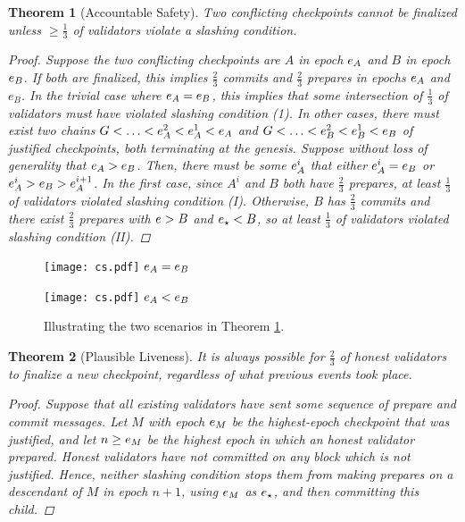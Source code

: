\documentclass[12pt, final]{article}
\newtheorem{theorem}{Theorem}
\newcommand{\epoch}{\ensuremath{e}\space}
\newcommand{\epochsource}{\ensuremath{\epoch_{\star}}\space}
\newcommand{\Genesisblock}{\ensuremath{G}\space}
\begin{document}
\begin{theorem}[Accountable Safety]
\label{theorem:safety}
Two conflicting checkpoints cannot be finalized unless $\geq \frac{1}{3}$ of validators violate a slashing condition.

\begin{proof}
Suppose the two conflicting checkpoints are $A$ in epoch $\epoch_A$ and $B$ in epoch $\epoch_B$. If both are finalized, this implies $\frac{2}{3}$ commits and $\frac{2}{3}$ prepares in epochs $\epoch_A$ and $e_B$. In the trivial case where $\epoch_A = \epoch_B$, this implies that some intersection of $\frac{1}{3}$ of validators must have violated slashing condition (1). In other cases, there must exist two chains $\Genesisblock < \ldots < \epoch_A^2 < \epoch_A^1 < \epoch_A$ and $\Genesisblock < \ldots < \epoch_B^2 < \epoch_B^1 < \epoch_B$ of justified checkpoints, both terminating at the genesis. Suppose without loss of generality that $\epoch_A > \epoch_B$. Then, there must be some $\epoch_A^i$ that either $\epoch_A^i = \epoch_B$ or $\epoch_A^i > \epoch_B > \epoch_A^{i+1}$. In the first case, since $A^i$ and $B$ both have $\frac{2}{3}$ prepares, at least $\frac{1}{3}$ of validators violated slashing condition (I). Otherwise, $B$ has $\frac{2}{3}$ commits and there exist $\frac{2}{3}$ prepares with $\epoch > B$ and $\epochsource < B$, so at least $\frac{1}{3}$ of validators violated slashing condition (II).
\end{proof}
\end{theorem}

\begin{figure}[h!tb]
\centering
   \begin{minipage}[b]{0.48\textwidth}
    \texttt{[image: cs.pdf]}
    \centering
    $\epoch_A = \epoch_B$
   \end{minipage}
   \begin{minipage}[b]{0.48\textwidth}
    \texttt{[image: cs.pdf]}
    \centering
    $\epoch_A < \epoch_B$
   \end{minipage}
\label{fig:conflicting_checkpoints}
\caption{Illustrating the two scenarios in Theorem \ref{theorem:safety}.}
\end{figure}

\begin{theorem}[Plausible Liveness]
\label{theorem:liveness}
It is always possible for $\frac{2}{3}$ of honest validators to finalize a new checkpoint, regardless of what previous events took place.

\begin{proof}
Suppose that all existing validators have sent some sequence of prepare and commit messages. Let $M$ with epoch $\epoch_M$ be the highest-epoch checkpoint that was justified, and let $n \ge \epoch_M$ be the highest epoch in which an honest validator prepared. Honest validators have not committed on any block which is not justified. Hence, neither slashing condition stops them from making prepares on a descendant of $M$ in epoch $n+1$, using $\epoch_M$ as $\epochsource$, and then committing this child.
\end{proof}

\end{theorem}
\end{document}
